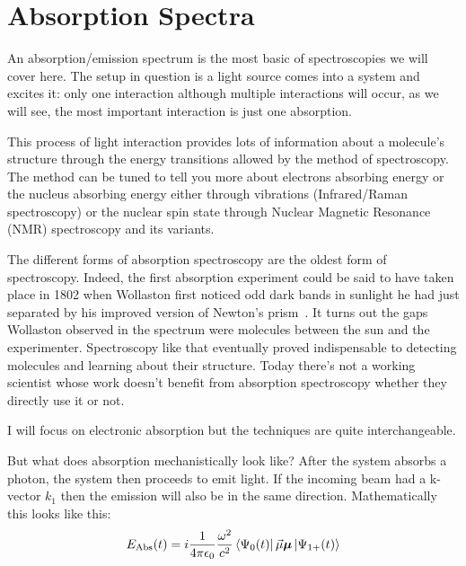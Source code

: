 \section{Absorption Spectra}
An absorption/emission spectrum is the most basic of spectroscopies we will cover here.  The setup in question is a light source comes into a system and excites it: only one interaction although multiple interactions will occur, as we will see, the most important interaction is just one absorption.

This process of light interaction provides lots of information about a molecule’s structure through the energy transitions allowed by the method of spectroscopy.  The method can be tuned to tell you more about electrons absorbing energy or the nucleus absorbing energy either through vibrations (Infrared/Raman spectroscopy) or the nuclear spin state through Nuclear Magnetic Resonance (NMR) spectroscopy and its variants.

The different forms of absorption spectroscopy are the oldest form of spectroscopy.  Indeed, the first absorption experiment could be said to have taken place in 1802 when Wollaston first noticed odd dark bands in sunlight he had just separated by his improved version of Newton’s prism~\cite{Wollaston}.  It turns out the gaps Wollaston observed in the spectrum were molecules between the sun and the experimenter.  Spectroscopy like that eventually proved indispensable to detecting molecules and learning about their structure.  Today there’s not a working scientist whose work doesn’t benefit from absorption spectroscopy whether they directly use it or not.

I will focus on electronic absorption but the techniques are quite interchangeable.

But what does absorption mechanistically look like?  After the system absorbs a photon, the system then proceeds to emit light.  If the incoming beam had a k-vector $k_1$ then the emission will also be in the same direction.  Mathematically this looks like this:
\begin{align}
	E_{\text{Abs}} (t) = i\frac{1}{4 \pi \epsilon_0} \frac{\omega^2}{c^2} \bra{\Psi_0 (t)} \vec{\mu} \boldsymbol{\mu} \ket{\Psi_{1+} (t)}
\end{align}

